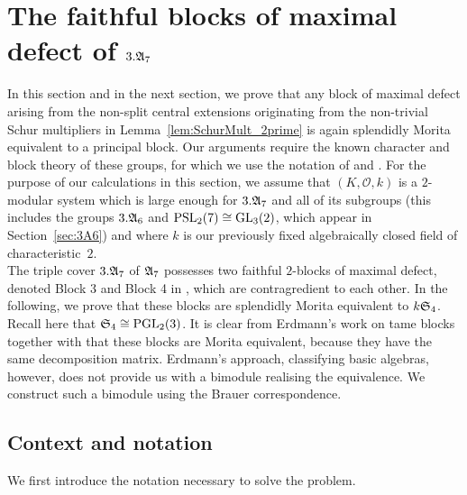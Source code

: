 
\section{The faithful blocks of maximal defect of \texorpdfstring{$3.{\mathfrak{A}}_7$}{3.A7}}\label{sec:3A7}%

In this section and in the next section, we prove that any block of maximal defect arising from the non-split central extensions originating from the non-trivial Schur multipliers in Lemma~\ref{lem:SchurMult_2prime} is again splendidly Morita equivalent to a principal block. Our arguments require the known character and block theory of these groups, for which we use the notation of \cite{ATLAS} and \cite{ModularAtlas}. 
For the purpose of our calculations in this section, we assume that $(K,\mathcal{O},k)$ is a $2$-modular system which is large enough for $3.{\mathfrak{A}}_7$ and all of its subgroups (this includes the groups $3.{\mathfrak{A}}_6$ and $\operatorname{PSL}_2(7)\cong \operatorname{GL}_3(2)$, which appear in Section~\ref{sec:3A6})   
and where $k$ is our previously fixed algebraically closed field of characteristic~$2$.\\


\noindent The triple cover $3.{\mathfrak{A}}_7$ of ${\mathfrak{A}}_7$ possesses two faithful $2$-blocks of maximal defect, denoted Block 3 and Block 4 in \cite[A7mod2]{ModularAtlas}, which are contragredient to each other. In the following, we prove that these blocks are splendidly Morita equivalent to $k{\mathfrak{S}}_4$.
Recall here that ${\mathfrak{S}}_4\cong\operatorname{PGL}_2(3)$. 
It is clear from Erdmann's work \cite{ErdmannTameBook} on tame blocks together with \cite[Theorem~2.1]{MacGregor22} that these blocks are Morita equivalent, because they have the same decomposition matrix.  Erdmann's approach, classifying basic algebras, however, does not provide us with a bimodule realising the equivalence. We construct such a bimodule using the Brauer correspondence.


\vspace{2mm}
\subsection{Context and notation}
We first introduce the notation necessary to solve the problem. 


